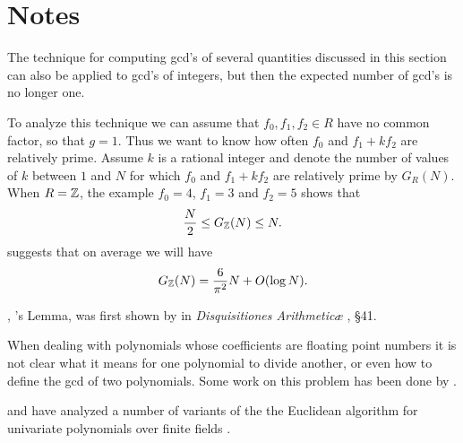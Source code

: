 \section*{Notes}

\small

 The technique for computing {\sc gcd}'s
of several quantities discussed in this section can also be applied to
{\sc gcd}'s of integers, but then the expected number of {\sc gcd}'s
is no longer one.

To analyze this technique we can assume
that $f_0, f_1, f_2 \in R$ have no common factor, so that $g=1$.  Thus
we want to know how often $f_0$ and $f_1 + k f_2$ are relatively
prime.  Assume $k$ is a rational integer and denote the number of
values of $k$ between $1$ and $N$ for which $f_0$ and $f_1+k f_2$ are
relatively prime by $G_R(N)$.  When $R = \mathbb{Z}$, the example $f_0 = 4$,
$f_1 = 3$ and $f_2=5$ shows that
\[
\frac{N}{2} \le G_{\mathbb{Z}}(N) \le N.
\]
 suggests that on average we will have
\[
G_{\mathbb{Z}}(N) = \frac{6}{\pi^2} N + O(\log N).
\]

, {\Gauss}'s Lemma, was first shown by
{\Gauss} in {\em Disquisitiones Arithmetic\ae}
\cite{Gauss1966-gm}, \S41. 

  When dealing with polynomials whose
coefficients are floating point numbers it is not clear what it means
for one polynomial to divide another, or even how to define the {\sc
gcd} of two polynomials.  Some work on this problem has been done by
{\Schoenhage} \cite{Schonhage1985-kh}.

{\Ma} and {\Gathen} have analyzed a number of variants of the the
Euclidean algorithm for univariate polynomials over finite fields
\cite{Ma1990-lm}. 

\normalsize

